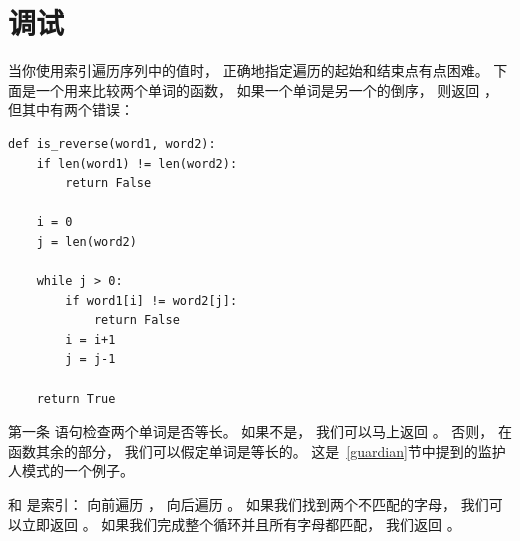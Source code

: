 \section{调试}
  
  


当你使用索引遍历序列中的值时， 正确地指定遍历的起始和结束点有点困难。  下面是一个用来比较两个单词的函数， 如果一个单词是另一个的倒序， 则返回  ， 但其中有两个错误：

\begin{lstlisting}
def is_reverse(word1, word2):
    if len(word1) != len(word2):
        return False

    i = 0
    j = len(word2)

    while j > 0:
        if word1[i] != word2[j]:
            return False
        i = i+1
        j = j-1

    return True
\end{lstlisting}

%
  
  

第一条  语句检查两个单词是否等长。  如果不是， 我们可以马上返回  。  否则， 在函数其余的部分， 我们可以假定单词是等长的。  这是~\ref{guardian}节中提到的监护人模式的一个例子。


 和  是索引： 向前遍历 ，  向后遍历 。  如果我们找到两个不匹配的字母， 我们可以立即返回 。  如果我们完成整个循环并且所有字母都匹配， 我们返回  。

